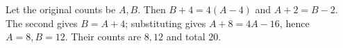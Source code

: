 Let the original counts be $A,B$. Then $B+4=4(A-4)$ and $A+2=B-2$. The second gives $B=A+4$; substituting gives $A+8=4A-16$, hence $A=8,B=12$. Their counts are $\boxed{8,12}$ and total $\boxed{20}$.
